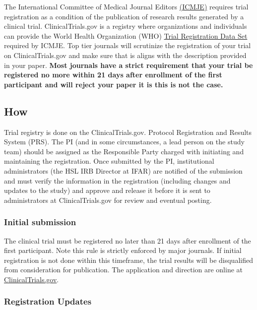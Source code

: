 \documentclass[]{book}
\theoremstyle{definition}
\theoremstyle{definition}
\theoremstyle{definition}
\theoremstyle{remark}
\begin{document}
The International Committee of Medical Journal Editors
\href{http://www.icmje.org/recommendations/browse/publishing-and-editorial-issues/clinical-trial-registration.html}{(ICMJE)}
requires trial registration as a condition of the publication of
research results generated by a clinical trial. ClinicalTrials.gov is a
registry where organizations and individuals can provide the World
Health Organization (WHO)
\href{http://www.who.int/ictrp/network/trds/en/index.html}{Trial
Registration Data Set} required by ICMJE. Top tier journals will
scrutinize the registration of your trial on ClinicalTrials.gov and make
sure that is aligns with the description provided in your paper.
\textbf{Most journals have a strict requirement that your trial be
registered no more within 21 days after enrollment of the first
participant and will reject your paper it is this is not the case.}

\subsection{How}\label{how-8}

Trial registry is done on the ClinicalTrials.gov. Protocol Registration
and Results System (PRS). The PI (and in some circumstances, a lead
person on the study team) should be assigned as the Responsible Party
charged with initiating and maintaining the registration. Once submitted
by the PI, institutional administrators (the HSL IRB Director at IFAR)
are notified of the submission and must verify the information in the
registration (including changes and updates to the study) and approve
and release it before it is sent to administrators at ClinicalTrials.gov
for review and eventual posting.

\subsubsection{Initial submission}\label{initial-submission}

The clinical trial must be registered no later than 21 days after
enrollment of the first participant. Note this rule is strictly enforced
by major journals. If initial registration is not done within this
timeframe, the trial results will be disqualified from consideration for
publication. The application and direction are online at
\href{https://clinicaltrials.gov/ct2/manage-recs/how-apply}{ClinicalTrials.gov}.

\subsubsection{Registration Updates}\label{registration-updates}
\end{document}

